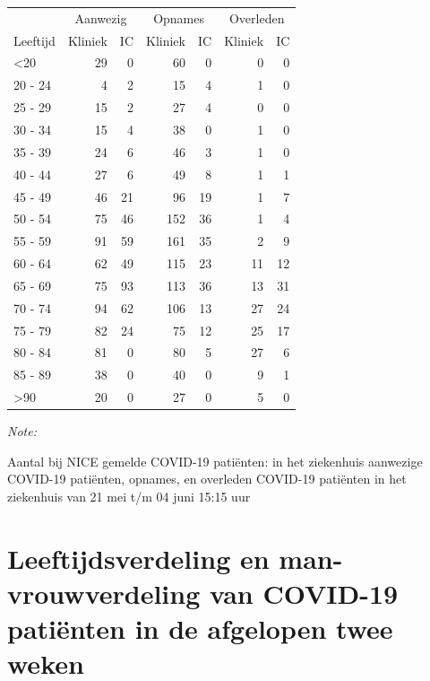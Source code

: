 \documentclass[
  english,
  man,floatsintext]{apa6}
\begin{document}
\begin{table}
\centering\begingroup\fontsize{10}{12}\selectfont

\begin{threeparttable}
\begin{tabular}{lrrrrrr}
\toprule
\multicolumn{1}{c}{ } & \multicolumn{2}{c}{Aanwezig} & \multicolumn{2}{c}{Opnames} & \multicolumn{2}{c}{Overleden} \\
\cmidrule(l{3pt}r{3pt}){2-3} \cmidrule(l{3pt}r{3pt}){4-5} \cmidrule(l{3pt}r{3pt}){6-7}
Leeftijd & Kliniek & IC & Kliniek & IC & Kliniek & IC\\
\midrule
<20 & 29 & 0 & 60 & 0 & 0 & 0\\
20 - 24 & 4 & 2 & 15 & 4 & 1 & 0\\
25 - 29 & 15 & 2 & 27 & 4 & 0 & 0\\
30 - 34 & 15 & 4 & 38 & 0 & 1 & 0\\
35 - 39 & 24 & 6 & 46 & 3 & 1 & 0\\
40 - 44 & 27 & 6 & 49 & 8 & 1 & 1\\
45 - 49 & 46 & 21 & 96 & 19 & 1 & 7\\
50 - 54 & 75 & 46 & 152 & 36 & 1 & 4\\
55 - 59 & 91 & 59 & 161 & 35 & 2 & 9\\
60 - 64 & 62 & 49 & 115 & 23 & 11 & 12\\
65 - 69 & 75 & 93 & 113 & 36 & 13 & 31\\
70 - 74 & 94 & 62 & 106 & 13 & 27 & 24\\
75 - 79 & 82 & 24 & 75 & 12 & 25 & 17\\
80 - 84 & 81 & 0 & 80 & 5 & 27 & 6\\
85 - 89 & 38 & 0 & 40 & 0 & 9 & 1\\
>90 & 20 & 0 & 27 & 0 & 5 & 0\\
\bottomrule
\end{tabular}
\begin{tablenotes}
\item \textit{Note: } 
\item Aantal bij NICE gemelde COVID-19 patiënten: in het ziekenhuis aanwezige COVID-19 patiënten, opnames, en overleden COVID-19 patiënten in het ziekenhuis van 21 mei t/m 04 juni 15:15 uur
\end{tablenotes}
\end{threeparttable}
\endgroup{}
\end{table}

\newpage

\hypertarget{leeftijdsverdeling-en-man-vrouwverdeling-van-covid-19-patiuxebnten-in-de-afgelopen-twee-weken}{%
\section{Leeftijdsverdeling en man-vrouwverdeling van COVID-19 patiënten in de afgelopen twee weken}\label{leeftijdsverdeling-en-man-vrouwverdeling-van-covid-19-patiuxebnten-in-de-afgelopen-twee-weken}}
\end{document}
